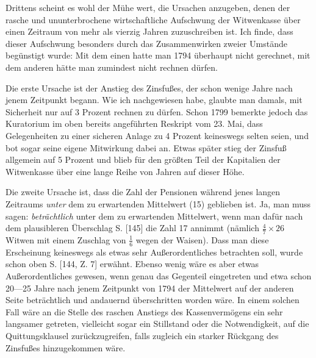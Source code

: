 Drittens scheint es wohl der Mühe wert, die Ursachen anzugeben, denen der rasche und ununterbrochene wirtschaftliche Aufschwung der Witwenkasse über einen Zeitraum von mehr als vierzig Jahren zuzuschreiben ist. Ich finde, dass dieser Aufschwung besonders durch das Zusammenwirken zweier Umstände begünstigt wurde: Mit dem einen hatte man 1794 überhaupt nicht gerechnet, mit dem anderen hätte man zumindest nicht rechnen dürfen.

Die erste Ursache ist der Anstieg des Zinsfußes, der schon wenige Jahre nach jenem Zeitpunkt begann. Wie ich nachgewiesen habe, glaubte man damals, mit Sicherheit nur auf 3 Prozent rechnen zu dürfen. Schon 1799 bemerkte jedoch das Kuratorium im oben bereits angeführten Reskript vom 23. Mai, dass Gelegenheiten zu einer sicheren Anlage zu 4 Prozent keineswegs selten seien, und bot sogar seine eigene Mitwirkung dabei an. Etwas später stieg der Zinsfuß allgemein auf 5 Prozent und blieb für den größten Teil der Kapitalien der Witwenkasse über eine lange Reihe von Jahren auf dieser Höhe.

Die zweite Ursache ist, dass die Zahl der Pensionen während jenes langen Zeitraums \textit{unter} dem zu erwartenden Mittelwert (15) geblieben ist. Ja, man muss sagen: \textit{beträchtlich} unter dem zu erwartenden Mittelwert, wenn man dafür nach dem plausibleren Überschlag S. [145] die Zahl 17 annimmt (nämlich \(\tfrac{4}{7}\times26\) Witwen mit einem Zuschlag von \(\tfrac{1}{6}\) wegen der Waisen). Dass man diese Erscheinung keineswegs als etwas sehr Außerordentliches betrachten soll, wurde schon oben S. [144, Z. 7] erwähnt. Ebenso wenig wäre es aber etwas Außerordentliches gewesen, wenn genau das Gegenteil eingetreten und etwa schon 20—25 Jahre nach jenem Zeitpunkt von 1794 der Mittelwert auf der anderen Seite beträchtlich und andauernd überschritten worden wäre. In einem solchen Fall wäre an die Stelle des raschen Anstiegs des Kassenvermögens ein sehr langsamer getreten, vielleicht sogar ein Stillstand oder die Notwendigkeit, auf die Quittungsklausel zurückzugreifen, falls zugleich ein starker Rückgang des Zinsfußes hinzugekommen wäre.

